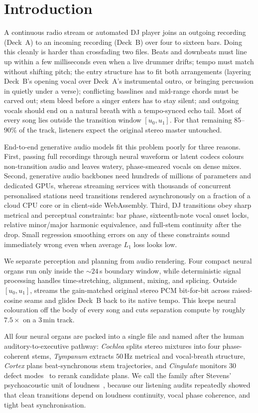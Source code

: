 \section{Introduction}
\label{sec:intro}

A continuous radio stream or automated DJ player joins an outgoing recording (Deck~A) to an incoming recording (Deck~B) over four to sixteen bars. Doing this cleanly is harder than crossfading two files. Beats and downbeats must line up within a few milliseconds even when a live drummer drifts; tempo must match without shifting pitch; the entry structure has to fit both arrangements (layering Deck~B's opening vocal over Deck~A's instrumental outro, or bringing percussion in quietly under a verse); conflicting basslines and mid-range chords must be carved out; stem bleed before a singer enters has to stay silent; and outgoing vocals should end on a natural breath with a tempo-synced echo tail. Most of every song lies outside the transition window $[u_0, u_1]$. For that remaining $85$--$90\%$ of the track, listeners expect the original stereo master untouched.

End-to-end generative audio models fit this problem poorly for three reasons. First, passing full recordings through neural waveform or latent codecs colours non-transition audio and leaves watery, phase-smeared vocals on dense mixes. Second, generative audio backbones need hundreds of millions of parameters and dedicated GPUs, whereas streaming services with thousands of concurrent personalised stations need transitions rendered asynchronously on a fraction of a cloud CPU core or in client-side WebAssembly. Third, DJ transitions obey sharp metrical and perceptual constraints: bar phase, sixteenth-note vocal onset locks, relative minor/major harmonic equivalence, and full-stem continuity after the drop. Small regression smoothing errors on any of these constraints sound immediately wrong even when average $L_1$ loss looks low.

We separate perception and planning from audio rendering. Four compact neural organs run only inside the $\sim 24$\,s boundary window, while deterministic signal processing handles time-stretching, alignment, mixing, and splicing. Outside $[u_0, u_1]$, \sone{} streams the gain-matched original stereo PCM bit-for-bit across raised-cosine seams and glides Deck~B back to its native tempo. This keeps neural colouration off the body of every song and cuts separation compute by roughly $7.5\times$ on a $3$\,min track.

All four neural organs are packed into a single  file and named after the human auditory-to-executive pathway: \emph{Cochlea} splits stereo mixtures into four phase-coherent stems, \emph{Tympanum} extracts $50$\,Hz metrical and vocal-breath structure, \emph{Cortex} plans beat-synchronous stem trajectories, and \emph{Cingulate} monitors $30$ defect modes~\citep{botvinick2001conflict} to rerank candidate plans. We call the family \sone{} after Stevens' psychoacoustic unit of loudness~\citep{stevens1936scale}, because our listening audits repeatedly showed that clean transitions depend on loudness continuity, vocal phase coherence, and tight beat synchronisation.

